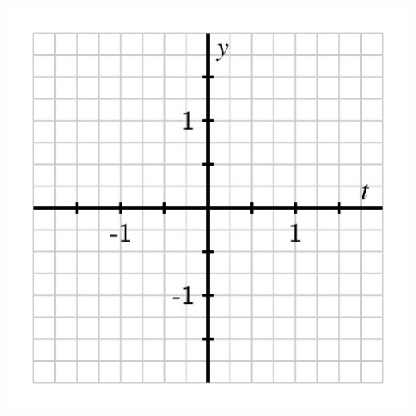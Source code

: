 \documentclass{ximera}
\begin{document}
\begin{problem}
\begin{image}
\includegraphics[width=0.8\linewidth]{inverse-trig-blank-axes-arcsin.png}
\end{image}
\end{problem}
\end{document}
